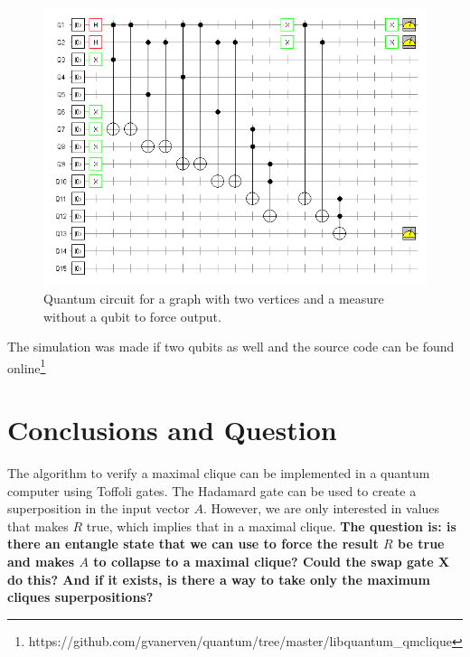 \documentclass[a4paper,12pt]{article}
\begin{document}
\begin{figure}[!ht]
	\label{fig:qcircuitnctr}
	\centering
	\includegraphics[width=1\textwidth]{qcliquencontr}
	\caption{Quantum circuit for a graph with two vertices and a measure without a qubit to force output.}
\end{figure}

The simulation was made if two qubits as well and the source code can be found online\footnote{https://github.com/gvanerven/quantum/tree/master/libquantum\_qmclique}

\pagebreak
\section{Conclusions and Question}

The algorithm to verify a maximal clique can be implemented in a quantum computer using Toffoli gates. The Hadamard gate can be used to create a superposition in the input vector $A$. However, we are only interested in values that makes $R$ true, which implies that in a maximal clique. \textbf{The question is: is there an entangle state that we can use to force the result $R$ be true and makes $A$ to collapse to a maximal clique? Could the swap gate X do this? And if it exists, is there a way to take only the maximum cliques superpositions?}
\end{document}
